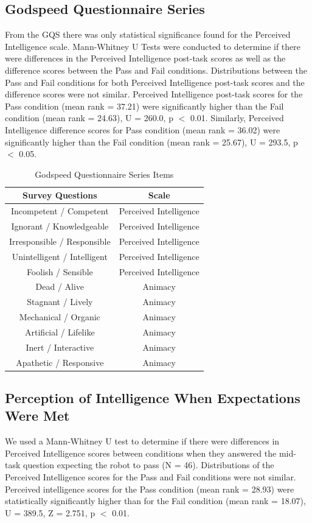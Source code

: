 \documentclass[letterpaper, 10 pt, conference]{ieeeconf}  %
\begin{document}
\subsection{Godspeed Questionnaire Series}
From the GQS there was only statistical significance found for the Perceived Intelligence scale. Mann-Whitney U Tests were conducted to determine if there were differences in the Perceived Intelligence post-task scores as well as the difference scores between the Pass and Fail conditions. Distributions between the Pass and Fail conditions for both Perceived Intelligence post-task scores and the difference scores were not similar. Perceived Intelligence post-task scores for the Pass condition (mean rank = 37.21) were significantly higher than the Fail condition (mean rank = 24.63), U = 260.0, p $<$ 0.01. Similarly, Perceived Intelligence difference scores for Pass condition (mean rank = 36.02) were significantly higher than the Fail condition (mean rank = 25.67), U = 293.5, p $<$ 0.05.
\begin{table}[h!]
\centering
\caption{Godspeed Questionnaire Series Items}
\begin{tabular}{| c c |}
\hline
\textbf{Survey Questions} &  \textbf{Scale} \\ \hline
Incompetent / Competent &Perceived Intelligence\\
Ignorant / Knowledgeable &Perceived Intelligence\\
Irresponsible / Responsible &Perceived Intelligence\\
Unintelligent / Intelligent &Perceived Intelligence\\
Foolish / Sensible  &Perceived Intelligence\\
Dead / Alive &  Animacy \\
Stagnant / Lively  &Animacy \\
Mechanical / Organic &Animacy \\
Artificial / Lifelike &Animacy \\
Inert / Interactive &Animacy \\
Apathetic / Responsive &Animacy \\
\hline
\end{tabular}
\end{table}

\subsection{Perception of Intelligence When Expectations Were Met}
We used a Mann-Whitney U test to determine if there were differences in Perceived Intelligence scores between conditions when they answered the mid-task question expecting the robot to pass (N = 46). Distributions of the Perceived Intelligence scores for the Pass and Fail conditions were not similar. Perceived intelligence scores for the Pass condition (mean rank = 28.93) were statistically significantly higher than for the Fail condition (mean rank = 18.07), U = 389.5, Z = 2.751, p $<$ 0.01.
\end{document}
